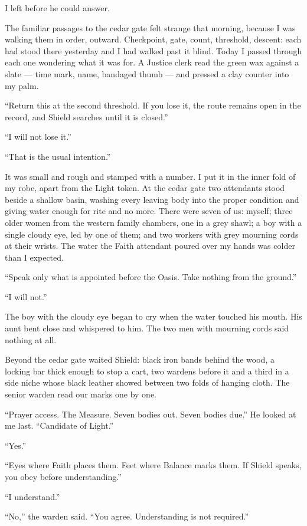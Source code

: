 I left before he could answer.\par

\ornament

The familiar passages to the cedar gate felt strange that morning, because I was walking them in order, outward. Checkpoint, gate, count, threshold, descent: each had stood there yesterday and I had walked past it blind. Today I passed through each one wondering what it was for. A Justice clerk read the green wax against a slate --- time mark, name, bandaged thumb --- and pressed a clay counter into my palm.\par

``Return this at the second threshold. If you lose it, the route remains open in the record, and Shield searches until it is closed.''\par
``I will not lose it.''\par
``That is the usual intention.''\par

It was small and rough and stamped with a number. I put it in the inner fold of my robe, apart from the Light token. At the cedar gate two attendants stood beside a shallow basin, washing every leaving body into the proper condition and giving water enough for rite and no more. There were seven of us: myself; three older women from the western family chambers, one in a grey shawl; a boy with a single cloudy eye, led by one of them; and two workers with grey mourning cords at their wrists. The water the Faith attendant poured over my hands was colder than I expected.\par

``Speak only what is appointed before the Oasis. Take nothing from the ground.''\par
``I will not.''\par

The boy with the cloudy eye began to cry when the water touched his mouth. His aunt bent close and whispered to him. The two men with mourning cords said nothing at all.\par

\ornament

Beyond the cedar gate waited Shield: black iron bands behind the wood, a locking bar thick enough to stop a cart, two wardens before it and a third in a side niche whose black leather showed between two folds of hanging cloth. The senior warden read our marks one by one.\par

``Prayer access. The Measure. Seven bodies out. Seven bodies due.'' He looked at me last. ``Candidate of Light.''\par
``Yes.''\par
``Eyes where Faith places them. Feet where Balance marks them. If Shield speaks, you obey before understanding.''\par
``I understand.''\par
``No,'' the warden said. ``You agree. Understanding is not required.''\par

